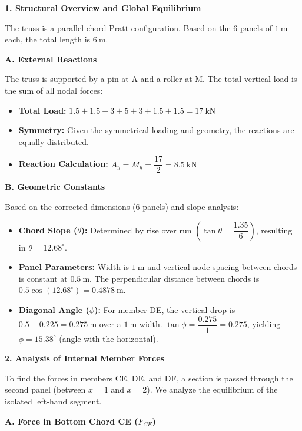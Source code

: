 \documentclass[12pt,a3paper]{article}
\begin{document}
\begin{enumerate}
\begin{tcolorbox}[enhanced,breakable,ansbox,colback=cE!4,colframe=cE,
  boxrule=0.8pt,arc=5pt,
  title={\textbf{Answer}},fonttitle=\bfseries\color{white},colbacktitle=cE]
\textbf{1. Structural Overview and Global Equilibrium}

The truss is a parallel chord Pratt configuration. Based on the 6 panels of $1\ \text{m}$ each, the total length is $6\ \text{m}$. 

\textbf{A. External Reactions}

The truss is supported by a pin at A and a roller at M. The total vertical load is the sum of all nodal forces:
\begin{itemize}[leftmargin=1.5em,itemsep=2pt]
  \item \textbf{Total Load:} $1.5 + 1.5 + 3 + 5 + 3 + 1.5 + 1.5 = 17\ \text{kN}$
  \item \textbf{Symmetry:} Given the symmetrical loading and geometry, the reactions are equally distributed.
  \item \textbf{Reaction Calculation:} $A_y = M_y = \dfrac{17}{2} = 8.5\ \text{kN}$
\end{itemize}

\textbf{B. Geometric Constants}

Based on the corrected dimensions (6 panels) and slope analysis:
\begin{itemize}[leftmargin=1.5em,itemsep=2pt]
  \item \textbf{Chord Slope ($\theta$):} Determined by rise over run $\left(\tan\theta = \dfrac{1.35}{6}\right)$, resulting in $\theta = 12.68^\circ$.
  \item \textbf{Panel Parameters:} Width is $1\ \text{m}$ and vertical node spacing between chords is constant at $0.5\ \text{m}$. The perpendicular distance between chords is $0.5 \cos(12.68^\circ) = 0.4878\ \text{m}$.
  \item \textbf{Diagonal Angle ($\phi$):} For member DE, the vertical drop is $0.5 - 0.225 = 0.275\ \text{m}$ over a $1\ \text{m}$ width. $\tan\phi = \dfrac{0.275}{1} = 0.275$, yielding $\phi = 15.38^\circ$ (angle with the horizontal).
\end{itemize}

\textbf{2. Analysis of Internal Member Forces}

To find the forces in members CE, DE, and DF, a section is passed through the second panel (between $x=1$ and $x=2$). We analyze the equilibrium of the isolated left-hand segment.

\textbf{A. Force in Bottom Chord CE ($F_{CE}$)}


\end{tcolorbox}
\end{enumerate}
\end{document}
